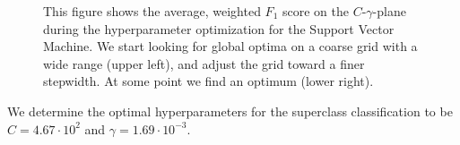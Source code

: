 \begin{figure}[H]
\hfill
{}
\hfill
{}
\hfill
\caption[Hyperparameter optimization for the Support Vector Machine (SVM)]{This figure shows the average, weighted $F_1$ score on the $C$-$\gamma$-plane during the hyperparameter optimization for the Support Vector Machine. We start looking for global optima on a coarse grid with a wide range (upper left), and adjust the grid toward a finer stepwidth. At some point we find an optimum (lower right).}
\label{fig:gridsearch-svm-superclasses}
\end{figure}

We determine the optimal hyperparameters for the superclass classification to be $C = 4.67 \cdot 10^{2}$ and $\gamma = 1.69 \cdot 10^{-3}$.

